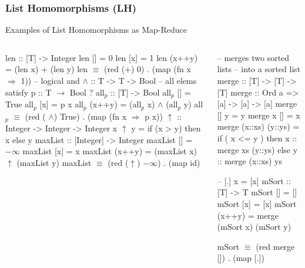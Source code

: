 \documentclass{beamer}
\renewcommand{\emph}[1]{\textcolor{structure}{#1}}
\newcommand{\emp}[1]{\textcolor{DikuRed}{ #1}}
\newcommand{\mymath}[1]{$ #1 $}
\newcommand{\myindx}[1]{_{#1}}
\begin{document}
\begin{frame}[fragile,t]
  \frametitle{List Homomorphisms (LH)}

\begin{block}{Examples of List Homomorphisms as Map-Reduce} \vspace{-1.5 ex}
\begin{columns}
\begin{colorcode}[fontsize=\scriptsize]
\emph{len} :: [T] -> Integer
\emph{len} []     = \emp{0}
\emph{len} [x]    = \emp{1}
\emph{len} (x++y) = (\emph{len} x) \emp{+} (\emph{len} y)
\emp{len \mymath{\equiv} (red (+) 0) . (map (fn x \mymath{\Rightarrow} 1))}
-- logical and \emp{\mymath{\wedge}} :: T -> T -> Bool 
-- all elems satisfy p :: T \mymath{\rightarrow} Bool ?
\emph{all\mymath{\myindx{p}}} :: [T] -> Bool
\emph{all\mymath{\myindx{p}}} []     = \emp{True}
\emph{all\mymath{\myindx{p}}} [x]    = \emp{p x} 
\emph{all\mymath{\myindx{p}}} (x++y) = (\emph{all\mymath{\myindx{p}}} x) \emp{\mymath{\wedge}} (\emph{all\mymath{\myindx{p}}} y)
\emp{all\mymath{\myindx{p}} \mymath{\equiv} (red (\emp{\mymath{\wedge}}) True) .} 
        \emp{(map (fn x \mymath{\Rightarrow} p x))}
\mymath{\uparrow} :: Integer -> Integer -> Integer
x \mymath{\uparrow} y = if (x > y) then x else y 
\emph{maxList} :: [Integer] -> Integer
\emph{maxList} []     = \emp{\mymath{-\infty}}
\emph{maxList} [x]    = \emp{x}
\emph{maxList} (x++y) = (\emph{maxList} x) \emp{\mymath{\uparrow}} 
                 (\emph{maxList} y)
\emp{maxList \mymath{\equiv} (red (\mymath{\uparrow}) \mymath{-\infty}) . (map id)}
\end{colorcode}
\begin{colorcode}[fontsize=\scriptsize]
-- merges two sorted lists
-- into a sorted list
merge :: [T] -> [T] -> [T]
merge :: Ord a => [a] -> [a] -> [a]
merge [] y  = y
merge x  [] = x
merge (x::xs) (y::ys) = 
  if ( x <= y ) 
  then x :: merge xs (y::ys)
  else y :: merge (x::xs) ys 

-- [.] x = [x]  
\emph{mSort} :: [T] -> T
\emph{mSort} []     = \emp{[]}
\emph{mSort} [x]    = \emp{[x]}
\emph{mSort} (x++y) = \emp{merge} (\emph{mSort} x)  
                     (\emph{mSort} y)

\emp{mSort \mymath{\equiv} (red merge []) . (map [.])}
\end{colorcode}
\end{columns}
\end{block}

\end{frame}
\end{document}
